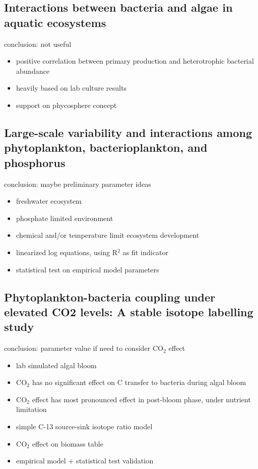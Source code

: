 \documentclass[a4paper,11pt]{article}
\begin{document}
    \subsection{Interactions between bacteria and algae in aquatic ecosystems}
    conclusion\autocite{cole1982interactions}: not useful
    \begin{itemize}
        \item positive correlation between primary production and heterotrophic bacterial abundance
        \item heavily based on lab culture results
        \item support on phycosphere concept
    \end{itemize}
    
    \subsection{Large-scale variability and interactions among phytoplankton, bacterioplankton, and phosphorus}
    conclusion\autocite{currie1990large}: maybe preliminary parameter ideas
    \begin{itemize}
        \item freshwater ecosystem
        \item phosphate limited environment
        \item chemical and/or temperature limit ecosystem development
        \item linearized log equations, using R$^2$ as fit indicator
        \item statistical test on empirical model parameters
    \end{itemize}
    
    \subsection{Phytoplankton-bacteria coupling under elevated CO2 levels: A stable isotope labelling study}
    conclusion\autocite{de2010phytoplankton}: parameter value if need to consider CO$_2$ effect
    \begin{itemize}
        \item lab simulated algal bloom
        \item CO$_2$ has no significant effect on C transfer to bacteria during algal bloom
        \item CO$_2$ effect has most pronounced effect in post-bloom phase, under nutrient limitation
        \item simple C-13 source-sink isotope ratio model
        \item CO$_2$ effect on biomass table
        \item empirical model + statistical test validation
    \end{itemize}
    
\end{document}
